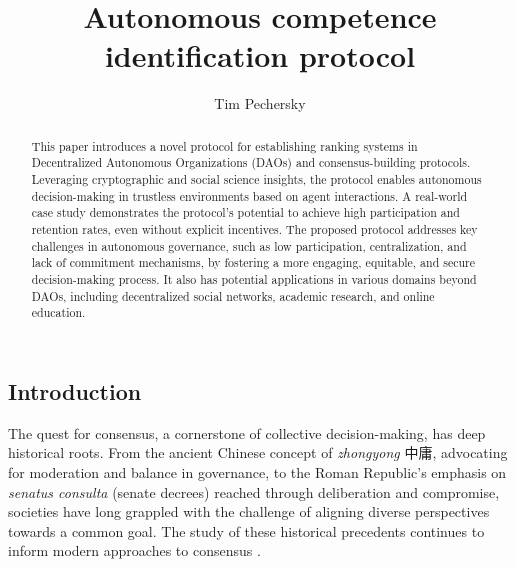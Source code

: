 \documentclass{article}
\title{Autonomous competence identification protocol}
\author{Tim Pechersky}
\begin{document}
\begin{CJK}{UTF8}{gbsn}

    \maketitle


    \begin{abstract}
        This paper introduces a novel protocol for establishing ranking systems in Decentralized Autonomous Organizations (DAOs) and consensus-building protocols. Leveraging cryptographic and social science insights, the protocol enables autonomous decision-making in trustless environments based on agent interactions. A real-world case study demonstrates the protocol's potential to achieve high participation and retention rates, even without explicit incentives. The proposed protocol addresses key challenges in autonomous governance, such as low participation, centralization, and lack of commitment mechanisms, by fostering a more engaging, equitable, and secure decision-making process. It also has potential applications in various domains beyond DAOs, including decentralized social networks, academic research, and online education.
    \end{abstract}
    \begin{multicols}{2}

        \section{Introduction}

        The quest for consensus, a cornerstone of collective decision-making, has deep historical roots. From the ancient Chinese concept of \textit{zhongyong} {
            中庸}, advocating for moderation and balance in governance, to the Roman Republic's emphasis on \textit{senatus consulta} (senate decrees) reached through deliberation and compromise, societies have long grappled with the challenge of aligning diverse perspectives towards a common goal. The study of these historical precedents continues to inform modern approaches to consensus \cite{Andersen2019} \cite{Frederic2014}. \\


\end{multicols}
\end{CJK}
\end{document}
